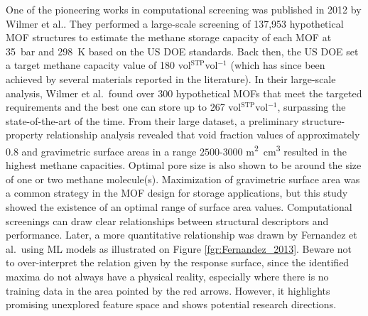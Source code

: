 \documentclass[main.tex]{subfiles}
\begin{document}
One of the pioneering works in computational screening was published in 2012 by Wilmer et al.\cite{Wilmer_2012}. They performed a large-scale screening of 137,953 hypothetical MOF structures to estimate the methane storage capacity of each MOF at \SI{35}{\bar} and \SI{298}{\kelvin} based on the US DOE standards. Back then, the US DOE set a target methane capacity value of 180 vol{\footnotesize$^\mathrm{STP}$}vol$^{-1}$ (which has since been achieved by several materials reported in the literature). In their large-scale analysis, Wilmer et al.\ found over 300 hypothetical MOFs that meet the targeted requirements and the best one can store up to 267 vol{\footnotesize$^\mathrm{STP}$}vol$^{-1}$, surpassing the state-of-the-art of the time. From their large dataset, a preliminary structure-property relationship analysis revealed that void fraction values of approximately 0.8 and gravimetric surface areas in a range $2500$-$3000$ \si{\square\meter\cubic\centi\meter} resulted in the highest methane capacities. Optimal pore size is also shown to be around the size of one or two methane molecule(s). Maximization of gravimetric surface area was a common strategy in the MOF design for storage applications, but this study showed the existence of an optimal range of surface area values. Computational screenings can draw clear relationships between structural descriptors and performance. Later, a more quantitative relationship was drawn by Fernandez et al.\ using ML models as illustrated on Figure \ref{fgr:Fernandez_2013}. Beware not to over-interpret the relation given by the response surface, since the identified maxima do not always have a physical reality, especially where there is no training data in the area pointed by the red arrows. However, it highlights promising unexplored feature space and shows potential research directions.
\end{document}
